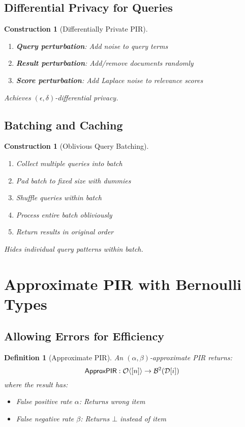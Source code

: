 \documentclass[11pt,final,hidelinks]{article}
\newcommand{\DB}{\mathcal{D}}
\newcommand{\Index}[1]{[#1]}
\newtheorem{definition}[theorem]{Definition}
\newtheorem{construction}[theorem]{Construction}
\begin{document}
\subsection{Differential Privacy for Queries}

\begin{construction}[Differentially Private PIR]
\begin{enumerate}
    \item \textbf{Query perturbation}: Add noise to query terms
    \item \textbf{Result perturbation}: Add/remove documents randomly
    \item \textbf{Score perturbation}: Add Laplace noise to relevance scores
\end{enumerate}
Achieves $(\epsilon, \delta)$-differential privacy.
\end{construction}

\subsection{Batching and Caching}

\begin{construction}[Oblivious Query Batching]
\begin{enumerate}
    \item Collect multiple queries into batch
    \item Pad batch to fixed size with dummies
    \item Shuffle queries within batch
    \item Process entire batch obliviously
    \item Return results in original order
\end{enumerate}
Hides individual query patterns within batch.
\end{construction}

\section{Approximate PIR with Bernoulli Types}

\subsection{Allowing Errors for Efficiency}

\begin{definition}[Approximate PIR]
An $(\alpha, \beta)$-approximate PIR returns:
\begin{equation}
\mathsf{ApproxPIR}: \Obv{\Index{n}} \to \Bernoulli{\DB[i]}{2}
\end{equation}
where the result has:
\begin{itemize}
    \item False positive rate $\alpha$: Returns wrong item
    \item False negative rate $\beta$: Returns $\bot$ instead of item
\end{itemize}
\end{definition}
\end{document}
